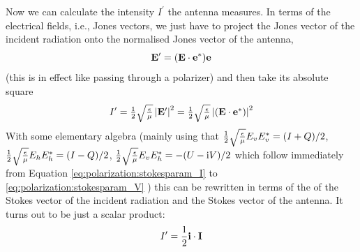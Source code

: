 Now we can calculate the intensity $I^\prime$ 
the antenna measures. In terms of the electrical fields, 
i.e., Jones vectors,  we just have to
project the Jones vector  of the incident radiation onto the
normalised Jones vector  of the antenna,
\begin{equation}
  \label{eq:polarization:antenna-projection}
   \mathbf{E}^\prime =  (\mathbf{E}\cdot\mathbf{e}^\ast) \mathbf{e}
\end{equation}
(this is in effect like passing through a polarizer) and then take its
absolute square
\begin{equation}
  \label{eq:polarization:antenna:intensity-jones}
  I^\prime =  \textstyle\frac{1}{2}\sqrt{\textstyle{\frac{\epsilon}{\mu}}}\left| \mathbf{E}^{\prime} \right| ^2 
   = \textstyle\frac{1}{2}\sqrt{\textstyle{\frac{\epsilon}{\mu}}}\left|(\mathbf{E}\cdot\mathbf{e}^\ast) \right| ^2 
\end{equation}
With some elementary algebra (mainly using that $\textstyle\frac{1}{2}\sqrt{\textstyle{\frac{\epsilon}{\mu}}} E_v
E_v^\ast = (I+Q)/2$, $\textstyle\frac{1}{2}\sqrt{\textstyle{\frac{\epsilon}{\mu}}} E_h E_h^\ast = (I-Q)/2$,
$\textstyle\frac{1}{2}\sqrt{\textstyle{\frac{\epsilon}{\mu}}} E_v E_h^\ast = -(U - \mathrm{i} V)/2$ which follow immediately
from Equation \ref{eq:polarization:stokesparam_I}
to \ref{eq:polarization:stokesparam_V} ) this can be rewritten in
terms of the of the Stokes vector  of the incident radiation
and the Stokes vector  of the antenna.  It turns out to be
just a scalar product:
\begin{equation}
  \label{eq:polarization:antenna:intensity-stokes}
  I^\prime = \frac{1}{2}\mathbf{i}\cdot\mathbf{I}
\end{equation}






